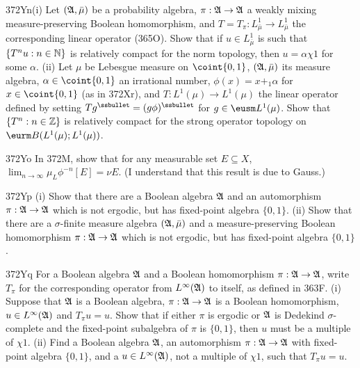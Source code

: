 {\spheader 372Yn(i)
Let $(\frak A,\bar\mu)$ be a probability algebra,
$\pi:\frak A\to\frak A$ a weakly mixing measure-preserving Boolean
homomorphism, and $T=T_{\pi}:L^1_{\bar\mu}\to L^1_{\bar\mu}$ the
corresponding linear operator (365O).   Show that if
$u\in L^1_{\bar\mu}$ is such that $\{T^nu:n\in\Bbb N\}$ is relatively
compact for the norm topology, then $u=\alpha\chi 1$ for some $\alpha$.
(ii) Let $\mu$ be Lebesgue measure on $\coint{0,1}$, $(\frak A,\bar\mu)$
its measure algebra, $\alpha\in\coint{0,1}$ an irrational number,
$\phi(x)=x+_1\alpha$ for $x\in\coint{0,1}$ (as in 372Xr), and
$T:L^1(\mu)\to L^1(\mu)$ the linear operator defined by setting
$Tg^{\ssbullet}=(g\phi)^{\ssbullet}$ for $g\in\eusm L^1(\mu)$.   Show
that $\{T^n:n\in\Bbb Z\}$ is relatively compact for the strong operator
topology on $\eurm B(L^1(\mu);L^1(\mu))$.

\spheader 372Yo In 372M, show that for any measurable set
$E\subseteq X$, $\lim_{n\to\infty}\mu_L\phi^{-n}[E]=\nu E$.
   (I understand that this result is due
to Gauss.)

\spheader 372Yp (i) Show that there are a Boolean algebra
$\frak A$ and an automorphism $\pi:\frak A\to\frak A$ which is not
ergodic, but has fixed-point algebra $\{0,1\}$.
(ii) Show that there are a $\sigma$-finite measure algebra
$(\frak A,\bar\mu)$ and a measure-preserving Boolean homomorphism
$\pi:\frak A\to\frak A$ which is not ergodic, but has fixed-point algebra
$\{0,1\}$.

\spheader 372Yq
For a Boolean algebra $\frak A$ and a Boolean homomorphism
$\pi:\frak A\to\frak A$, write $T_{\pi}$ for the corresponding operator
from $L^{\infty}(\frak A)$ to itself, as defined in 363F.
(i) Suppose that $\frak A$ is a Boolean algebra, $\pi:\frak A\to\frak A$ is
a Boolean homomorphism, $u\in L^{\infty}(\frak A)$ and $T_{\pi}u=u$.
Show that if either $\pi$ is ergodic or $\frak A$ is
Dedekind $\sigma$-complete and the fixed-point subalgebra of $\pi$ is
$\{0,1\}$, then $u$ must be a multiple of $\chi 1$.
(ii)
Find a Boolean algebra $\frak A$, an automorphism
$\pi:\frak A\to\frak A$ with fixed-point algebra $\{0,1\}$,
and a $u\in L^{\infty}(\frak A)$, not a
multiple of $\chi 1$, such that $T_{\pi}u=u$.

}
